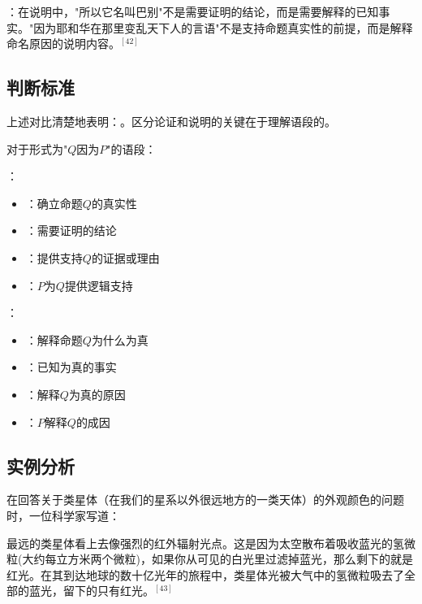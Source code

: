 ：在说明中，"所以它名叫巴别"不是需要证明的结论，而是需要解释的已知事实。"因为耶和华在那里变乱天下人的言语"不是支持命题真实性的前提，而是解释命名原因的说明内容。$^{[42]}$

\subsection{判断标准}

上述对比清楚地表明：。区分论证和说明的关键在于理解语段的。

\begin{theorembox}[title=判断标准的形式化表述]
对于形式为"$Q$因为$P$"的语段：

：
\begin{itemize}
  \item {}：确立命题$Q$的真实性
  \item {}：需要证明的结论
  \item {}：提供支持$Q$的证据或理由
  \item {}：$P$为$Q$提供逻辑支持
\end{itemize}

：
\begin{itemize}
  \item {}：解释命题$Q$为什么为真
  \item {}：已知为真的事实
  \item {}：解释$Q$为真的原因
  \item {}：$P$解释$Q$的成因
\end{itemize}
\end{theorembox}

\subsection{实例分析}

在回答关于类星体（在我们的星系以外很远地方的一类天体）的外观颜色的问题时，一位科学家写道：

\begin{displayquote}
最远的类星体看上去像强烈的红外辐射光点。这是因为太空散布着吸收蓝光的氢微粒(大约每立方米两个微粒)，如果你从可见的白光里过滤掉蓝光，那么剩下的就是红光。在其到达地球的数十亿光年的旅程中，类星体光被大气中的氢微粒吸去了全部的蓝光，留下的只有红光。$^{[43]}$
\end{displayquote}

